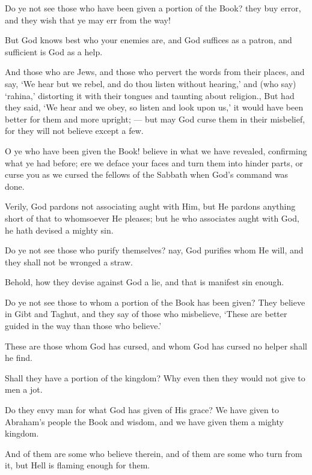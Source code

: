 \documentclass[fontsize=14pt, letterpaper, notitlepage, openany, DIV=12]{scrbook} %
\begin{document}
\noindent[4:44]
Do ye not see those who have been given a portion of the Book? they buy error, and they
wish that ye may err from the way!

\noindent[4:45]
But God knows best who your enemies are, and God suffices as a patron, and sufficient is
God as a help.

\noindent[4:46]
And those who are Jews, and those who pervert the words from their places, and say,
`We hear but we rebel, and do thou listen without hearing,' and (who say) `rahina,' distorting it
with their tongues and taunting about religion., But had they said, `We hear and we obey, so
listen and look upon us,' it would have been better for them and more upright; --- but may God
curse them in their misbelief, for they will not believe except a few.

\noindent[4:47]
O ye who have been given the Book! believe in what we have revealed, confirming what
ye had before; ere we deface your faces and turn them into hinder parts, or curse you as we
cursed the fellows of the Sabbath when God's command was done.

\noindent[4:48]
Verily, God pardons not associating aught with Him, but He pardons anything short of
that to whomsoever He pleases; but he who associates aught with God, he hath devised a mighty
sin.

\noindent[4:49]
Do ye not see those who purify themselves? nay, God purifies whom He will, and they
shall not be wronged a straw.

\noindent[4:50]
Behold, how they devise against God a lie, and that is manifest sin enough.

\noindent[4:51]
Do ye not see those to whom a portion of the Book has been given? They believe in Gibt
and Taghut, and they say of those who misbelieve, `These are better guided in the way than those
who believe.'

\noindent[4:52]
These are those whom God has cursed, and whom God has cursed no helper shall he find.

\noindent[4:53]
Shall they have a portion of the kingdom? Why even then they would not give to men a
jot.

\noindent[4:54]
Do they envy man for what God has given of His grace? We have given to Abraham's
people the Book and wisdom, and we have given them a mighty kingdom.

\noindent[4:55]
And of them are some who believe therein, and of them are some who turn from it, but
Hell is flaming enough for them.
\end{document}
